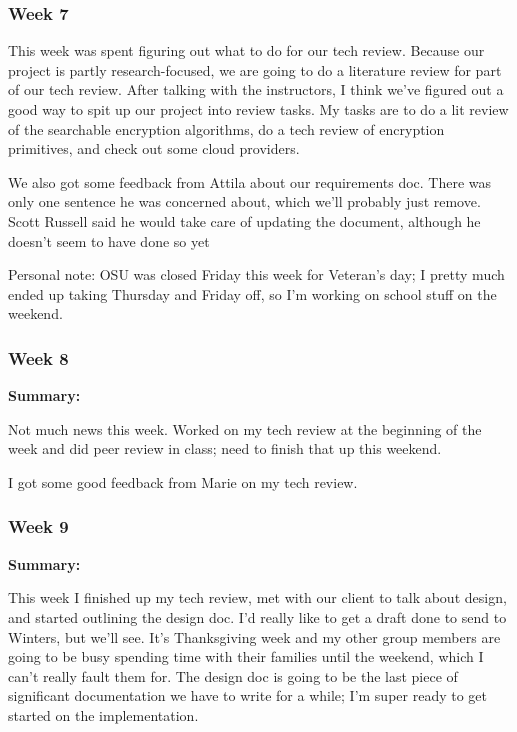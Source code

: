 \subsubsection{Week 7}

This week was spent figuring out what to do for our tech review. Because our project is partly research-focused, we are going to do a literature review for part of our tech review. After talking with the instructors, I think we've figured out a good way to spit up our project into  review tasks. My tasks are to do a lit review of the searchable encryption algorithms, do a tech review of encryption primitives, and check out some cloud providers.

We also got some feedback from Attila about our requirements doc. There was only one sentence he was concerned about, which we'll probably just remove. Scott Russell said he would take care of updating the document, although he doesn't seem to have done so yet

Personal note: OSU was closed Friday this week for Veteran's day; I pretty much ended up taking Thursday and Friday off, so I'm working on school stuff on the weekend.

\subsubsection{Week 8}

\noindent \textbf{Summary:}

Not much news this week. Worked on my tech review at the beginning of the week and did peer review in class; need to finish that up this weekend.

I got some good feedback from Marie on my tech review.

\subsubsection{Week 9}

\noindent \textbf{Summary:}

This week I finished up my tech review, met with our client to talk about design, and started outlining the design doc. I'd really like to get a draft done to send to Winters, but we'll see. It's Thanksgiving week and my other group members are going to be busy spending time with their families until the weekend, which I can't really fault them for. The design doc is going to be the last piece of significant documentation we have to write for a while; I'm super ready to get started on the implementation.


